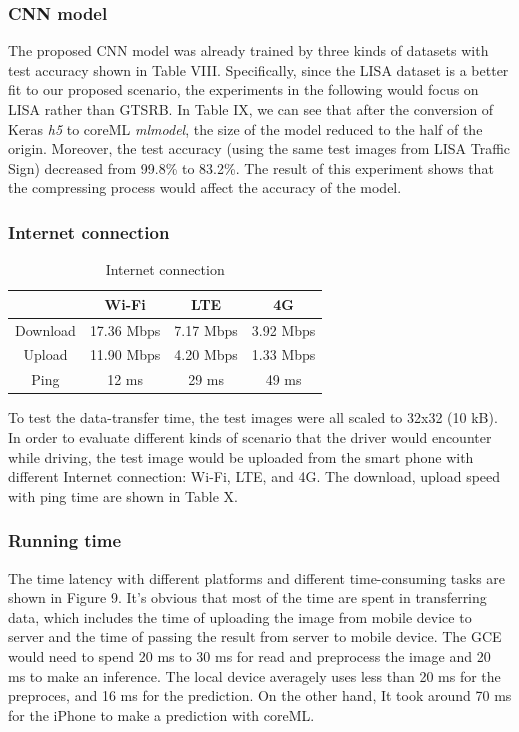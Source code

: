 \documentclass[conference]{IEEEtran}
\begin{document}
\subsubsection{CNN model}
The proposed CNN model was already trained by three kinds of datasets with test accuracy shown in Table VIII. Specifically, since the LISA dataset is a better fit to our proposed scenario, the experiments in the following would focus on LISA rather than GTSRB. In Table IX, we can see that after the conversion of Keras \textit{h5} to coreML \textit{mlmodel}, the size of the model reduced to the half of the origin. Moreover, the test accuracy (using the same test images from LISA Traffic Sign) decreased from 99.8\% to 83.2\%. The result of this experiment shows that the compressing process would affect the accuracy of the model.

\subsubsection{Internet connection}
\begin{table}[H]
\caption{Internet connection}
\begin{center}
\begin{tabular}{|c|c|c|c|}
\hline
& \textbf{Wi-Fi} & \textbf{LTE} & \textbf{4G}\\
\hline
Download & 17.36 Mbps & 7.17 Mbps & 3.92 Mbps\\
\hline
Upload & 11.90 Mbps & 4.20 Mbps & 1.33 Mbps\\
\hline
Ping & 12 ms & 29 ms & 49 ms\\
\hline
\end{tabular}
\label{tab4}
\end{center}
\end{table}
To test the data-transfer time, the test images were all scaled to 32x32 (10 kB). In order to evaluate different kinds of scenario that the driver would encounter while driving, the test image would be uploaded from the smart phone with different Internet connection: Wi-Fi, LTE, and 4G. The download, upload speed with ping time are shown in Table X. 
\subsubsection{Running time}
The time latency with different platforms and different time-consuming tasks are shown in Figure 9. It's obvious that most of the time are spent in transferring data, which includes the time of uploading the image from mobile device to server and the time of passing the result from server to mobile device. The GCE would need to spend 20 ms to 30 ms for read and preprocess the image and 20 ms to make an inference. The local device averagely uses less than 20 ms for the preproces, and 16 ms for the prediction. On the other hand, It took around 70 ms for the iPhone to make a prediction with coreML.
\end{document}

